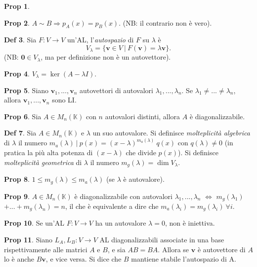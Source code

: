 \documentclass[]{article}
\newcommand{\bl}[1]{\mathbf{#1}}
\newcommand{\vv}{\mathbf{v}}
\theoremstyle{definition}
\theoremstyle{definition}
\newtheorem{prop}{Prop}[subsection]
\theoremstyle{definition}
\newtheorem{dfn}[prop]{Def}
\begin{document}
\begin{prop}
\end{prop} \begin{prop} $A \sim B \Rightarrow p_A (x) = p_B (x)$. (NB: il contrario non è vero).

\end{prop} \begin{dfn} Sia $F: V \to V$ un'AL, l'\emph{autospazio} di $F$ su $\lambda$ è 
$$V_{\lambda}=\{ \vv \in V \ | \ F( \vv ) = \lambda \vv\}.$$
(NB: $\bl{0} \in V_{\lambda}$, ma per definizione non è un autovettore).

\end{dfn} \begin{prop} $V_{\lambda} = \ker(A - \lambda I).$ 

\end{prop} \begin{prop} Siano $\vv _1 ,..., \vv _n $ autovettori di autovalori $\lambda _1 ,..., \lambda _n$. Se $\lambda _1 \neq ... \neq \lambda _n$, allora $\vv _1 ,..., \vv _n $ sono LI.

\end{prop} \begin{prop} Sia $A \in M_n (\mathbb{K})$ con $n$ autovalori distinti, allora $A$ è diagonalizzabile.

\end{prop} \begin{dfn} Sia $A \in M_n (\mathbb{K})$ e $\lambda$ un suo autovalore. Si definisce \emph{molteplicità algebrica} di $\lambda$ il numero $m_a (\lambda ) \ | \ p(x) = (x- \lambda) ^{m_a (\lambda )} \ q(x)$ con $q(\lambda ) \neq 0$ (in pratica la più alta potenza di $(x- \lambda)$ che divide $p(x)$). Si definisce \emph{molteplicità geometrica} di $\lambda$ il numero $m_g (\lambda) = \dim V_{\lambda}$.

\end{dfn} \begin{prop} $1 \leq m_g (\lambda ) \leq m_a (\lambda )$ (se $\lambda$ è autovalore).

\end{prop} \begin{prop} $A \in M_n (\mathbb{K})$ è diagonalizzabile con autovalori $\lambda _1 ,..., \lambda _n$ $\Leftrightarrow$ $m_g (\lambda _1)$ $+...+ m_g (\lambda _n) = n$, il che è equivalente a dire che $m_a (\lambda _i ) = m_g (\lambda _i )\ \forall i$.

\end{prop} \begin{prop} Se un'AL $F: V \to V$ ha un autovalore $\lambda=0$, non è iniettiva.

\end{prop} \begin{prop} Siano $L_A , L_B : V \to V$ AL diagonalizzabili associate in una base rispettivamente alle matrici $A$ e $B$, e sia $AB=BA$. Allora se $\vv$ è autovettore di $A$ lo è anche $B \vv$, e vice versa. Si dice che $B$ mantiene stabile l'autospazio di A.
\end{prop}
\end{document}

